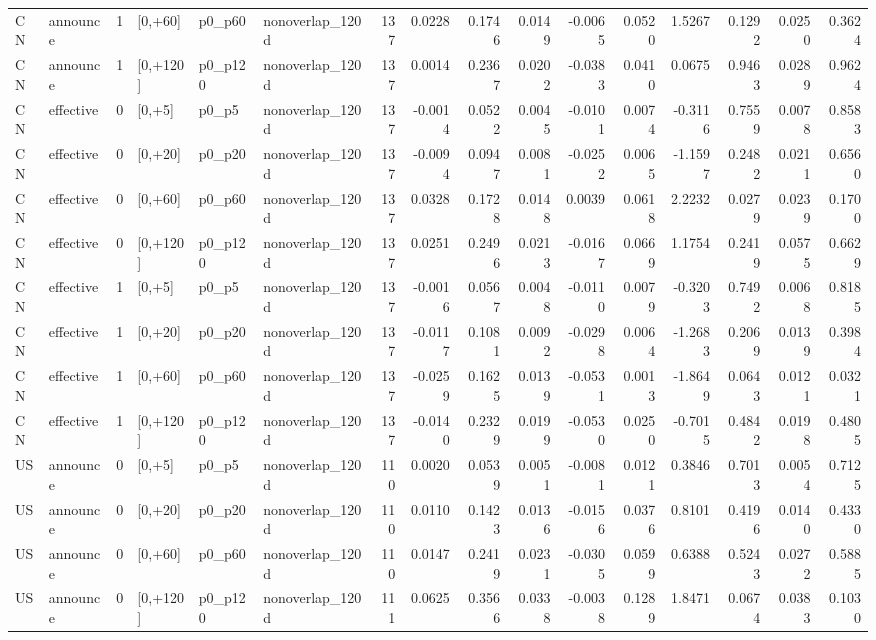 \begin{tabular}{llrlllrrrrrrrrrr}
CN & announce & 1 & [0,+60] & p0_p60 & nonoverlap_120d & 137 & 0.0228 & 0.1746 & 0.0149 & -0.0065 & 0.0520 & 1.5267 & 0.1292 & 0.0250 & 0.3624 \\
CN & announce & 1 & [0,+120] & p0_p120 & nonoverlap_120d & 137 & 0.0014 & 0.2367 & 0.0202 & -0.0383 & 0.0410 & 0.0675 & 0.9463 & 0.0289 & 0.9624 \\
CN & effective & 0 & [0,+5] & p0_p5 & nonoverlap_120d & 137 & -0.0014 & 0.0522 & 0.0045 & -0.0101 & 0.0074 & -0.3116 & 0.7559 & 0.0078 & 0.8583 \\
CN & effective & 0 & [0,+20] & p0_p20 & nonoverlap_120d & 137 & -0.0094 & 0.0947 & 0.0081 & -0.0252 & 0.0065 & -1.1597 & 0.2482 & 0.0211 & 0.6560 \\
CN & effective & 0 & [0,+60] & p0_p60 & nonoverlap_120d & 137 & 0.0328 & 0.1728 & 0.0148 & 0.0039 & 0.0618 & 2.2232 & 0.0279 & 0.0239 & 0.1700 \\
CN & effective & 0 & [0,+120] & p0_p120 & nonoverlap_120d & 137 & 0.0251 & 0.2496 & 0.0213 & -0.0167 & 0.0669 & 1.1754 & 0.2419 & 0.0575 & 0.6629 \\
CN & effective & 1 & [0,+5] & p0_p5 & nonoverlap_120d & 137 & -0.0016 & 0.0567 & 0.0048 & -0.0110 & 0.0079 & -0.3203 & 0.7492 & 0.0068 & 0.8185 \\
CN & effective & 1 & [0,+20] & p0_p20 & nonoverlap_120d & 137 & -0.0117 & 0.1081 & 0.0092 & -0.0298 & 0.0064 & -1.2683 & 0.2069 & 0.0139 & 0.3984 \\
CN & effective & 1 & [0,+60] & p0_p60 & nonoverlap_120d & 137 & -0.0259 & 0.1625 & 0.0139 & -0.0531 & 0.0013 & -1.8649 & 0.0643 & 0.0121 & 0.0321 \\
CN & effective & 1 & [0,+120] & p0_p120 & nonoverlap_120d & 137 & -0.0140 & 0.2329 & 0.0199 & -0.0530 & 0.0250 & -0.7015 & 0.4842 & 0.0198 & 0.4805 \\
US & announce & 0 & [0,+5] & p0_p5 & nonoverlap_120d & 110 & 0.0020 & 0.0539 & 0.0051 & -0.0081 & 0.0121 & 0.3846 & 0.7013 & 0.0054 & 0.7125 \\
US & announce & 0 & [0,+20] & p0_p20 & nonoverlap_120d & 110 & 0.0110 & 0.1423 & 0.0136 & -0.0156 & 0.0376 & 0.8101 & 0.4196 & 0.0140 & 0.4330 \\
US & announce & 0 & [0,+60] & p0_p60 & nonoverlap_120d & 110 & 0.0147 & 0.2419 & 0.0231 & -0.0305 & 0.0599 & 0.6388 & 0.5243 & 0.0272 & 0.5885 \\
US & announce & 0 & [0,+120] & p0_p120 & nonoverlap_120d & 111 & 0.0625 & 0.3566 & 0.0338 & -0.0038 & 0.1289 & 1.8471 & 0.0674 & 0.0383 & 0.1030 \\

\end{tabular}
